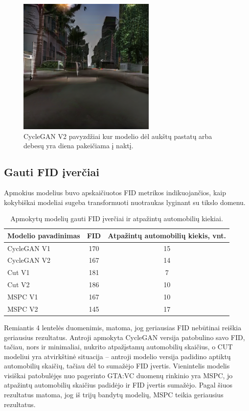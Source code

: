 \documentclass{VUMIFPSkursinis}
\begin{document}
\begin{figure}[H]
                \includegraphics[scale=0.7]{img/debesu_fake}
                \caption{CycleGAN V2 pavyzdžiai kur modelio dėl aukštų pastatų arba debesų yra diena  pakeičiama į naktį.}
                \label{img:mlp}
            \end{figure}
        
        \subsection{Gauti FID įverčiai}
            Apmokius modelius buvo apskaičiuotos FID metrikos indikuojančios, kaip kokybiškai modeliai sugeba transformuoti nuotraukas lyginant su tikslo domenu.
            \begin{table}[H]
                \footnotesize
                \centering
                \caption{Apmokytų modelių gauti FID įverčiai ir atpažintų automobilių kiekiai.}
                {\begin{tabular}{|l|c|c|} \hline
                    Modelio pavadinimas & FID & Atpažintų automobilių kiekis, vnt.\\
                    \hline
                    CycleGAN V1 & 170 & 15\\
                    CycleGAN V2 & 167 & 14\\
                    Cut V1 & 181 & 7\\
                    Cut V2 & 186 & 10\\ 
                    MSPC V1 & 167 & 10\\
                    MSPC V2 & 145 & 17\\
                    \hline
                    \end{tabular}
                }
                \label{tab:table example}
            \end{table}

            Remiantis 4 lentelės duomenimis, matoma, jog geriausias FID nebūtinai reiškia geriausius rezultatus. Antroji apmokyta CycleGAN versija patobulino savo FID, tačiau, nors ir minimaliai, nukrito atpažįstamų automobilių skaičius, o CUT modeliui yra atvirkštinė situacija – antroji modelio versija padidino aptiktų automobilių skaičių, tačiau dėl to sumažėjo FID įvertis. Vienintelis modelis visiškai patobulėjęs nuo pagerinto GTA:VC duomenų rinkinio yra MSPC, jo atpažintų automobilių skaičius padidėjo ir FID įvertis sumažėjo. Pagal šiuos rezultatus matoma, jog iš trijų bandytų modelių, MSPC teikia geriausius rezultatus.
            
\end{document}
